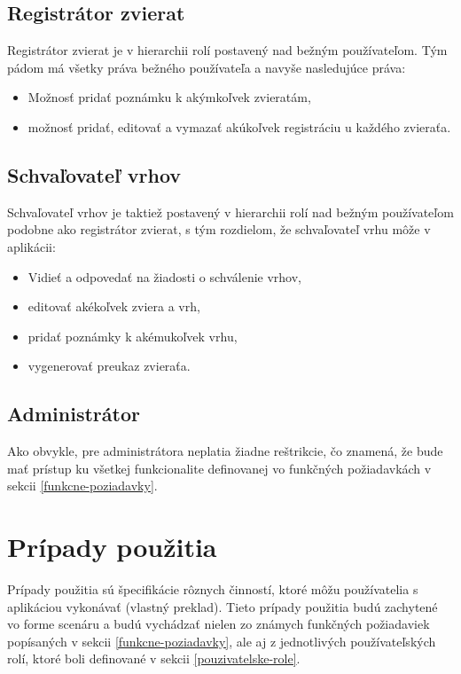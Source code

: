 \subsection{Registrátor zvierat}\label{registrator-zvierat}
Registrátor zvierat je v hierarchii rolí postavený nad bežným používateľom. Tým pádom má všetky práva bežného používateľa a navyše nasledujúce práva:

\begin{itemize}
	\item Možnosť pridať poznámku k akýmkoľvek zvieratám,
	\item možnosť pridať, editovať a vymazať akúkoľvek registráciu u každého zvieraťa.
\end{itemize} 

\subsection{Schvaľovateľ vrhov}\label{schvaľovateľ-vrhov}
Schvaľovateľ vrhov je taktiež postavený v hierarchii rolí nad bežným používateľom podobne ako registrátor zvierat, s tým rozdielom, že schvaľovateľ vrhu môže v aplikácii:

\begin{itemize}
	\item Vidieť a odpovedať na žiadosti o schválenie vrhov,
	\item editovať akékoľvek zviera a vrh,
	\item pridať poznámky k akémukoľvek vrhu,
	\item vygenerovať preukaz zvieraťa.
\end{itemize}

\subsection{Administrátor}\label{administrator}
Ako obvykle, pre administrátora neplatia žiadne reštrikcie, čo znamená, že bude mať prístup ku všetkej funkcionalite definovanej vo funkčných požiadavkách v sekcii \ref{funkcne-poziadavky}.

\pagebreak

\section{Prípady použitia}\label{pripady-pouzitia}
Prípady použitia sú špecifikácie rôznych činností, ktoré môžu používatelia s aplikáciou vykonávať \cite{co-su-pripady-pouzitia} (vlastný preklad). Tieto prípady použitia budú zachytené vo forme scenáru a budú vychádzať nielen zo známych funkčných požiadaviek popísaných v sekcii \ref{funkcne-poziadavky}, ale aj z jednotlivých používateľských rolí, ktoré boli definované v sekcii \ref{pouzivatelske-role}.

